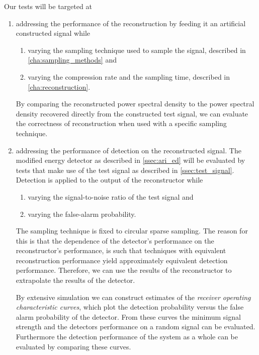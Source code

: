 \documentclass[a4paper, openany, oneside]{memoir}
\begin{document}
Our tests will be targeted at
\begin{enumerate}
	\item addressing the performance of the reconstruction by feeding it an artificial constructed signal while
	\begin{enumerate}
		\item varying the sampling technique used to sample the signal, described in \cref{cha:sampling_methods} and
		\item varying the compression rate and the sampling time, described in \cref{cha:reconstruction}.
	\end{enumerate}
	By comparing the reconstructed power spectral density to the power spectral density recovered directly from the constructed test signal, we can evaluate the correctness of reconstruction when used with a specific sampling technique.
	\item addressing the performance of detection on the reconstructed signal. The modified energy detector as described in \cref{ssec:ari_ed} will be evaluated by tests that make use of the test signal as described in \cref{ssec:test_signal}. 
	Detection is applied to the output of the reconstructor while	
	\begin{enumerate}
		\item varying the signal-to-noise ratio of the test signal and
		\item varying the false-alarm probability.
	\end{enumerate}

	The sampling technique is fixed to circular sparse sampling. The reason for this is that the dependence of the detector's performance on the reconstructor's performance, is such that techniques with equivalent reconstruction performance yield approximately equivalent detection performance. Therefore, we can use the results of the reconstructor to extrapolate the results of the detector.

	By extensive simulation we can construct estimates of the \emph{receiver operating characteristic curves}, which plot the detection probability versus the false alarm probability of the detector. From these curves the minimum signal strength and the detectors performance on a random signal can be evaluated. Furthermore the detection performance of the system as a whole can be evaluated by comparing these curves.
	\end{enumerate}
\end{document}
